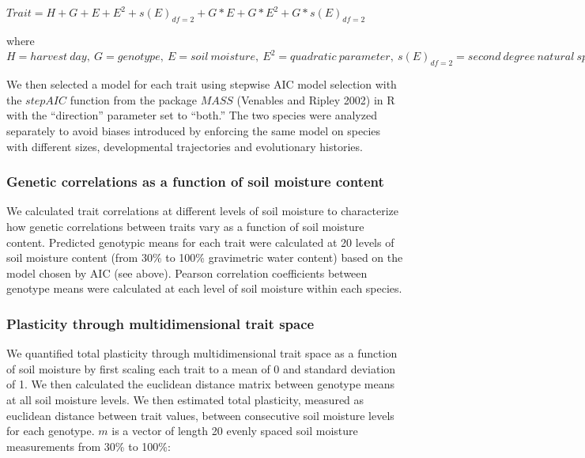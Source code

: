 \documentclass[jou,floatsintext]{apa6}
\begin{document}
\(Trait = H+G+E+E^2+s(E)_{df=2}+G*E+G*E^2+G*s(E)_{df=2}\)

where \(H = harvest\ day, \ G = genotype,\ E = soil\ moisture,\ E^2 = quadratic\ parameter,\ s(E)_{df=2} = second\ degree\ natural\ spline\ parameter\)

We then selected a model for each trait using stepwise AIC model selection with the \(stepAIC\) function from the package \(MASS\) (Venables and Ripley 2002) in R with the \enquote{direction} parameter set to \enquote{both.} The two species were analyzed separately to avoid biases introduced by enforcing the same model on species with different sizes, developmental trajectories and evolutionary histories.

\hypertarget{genetic-correlations-as-a-function-of-soil-moisture-content}{%
\subsubsection{Genetic correlations as a function of soil moisture content}\label{genetic-correlations-as-a-function-of-soil-moisture-content}}

We calculated trait correlations at different levels of soil moisture to characterize how genetic correlations between traits vary as a function of soil moisture content. Predicted genotypic means for each trait were calculated at 20 levels of soil moisture content (from 30\% to 100\% gravimetric water content) based on the model chosen by AIC (see above). Pearson correlation coefficients between genotype means were calculated at each level of soil moisture within each species.

\hypertarget{plasticity-through-multidimensional-trait-space}{%
\subsubsection{Plasticity through multidimensional trait space}\label{plasticity-through-multidimensional-trait-space}}

We quantified total plasticity through multidimensional trait space as a function of soil moisture by first scaling each trait to a mean of 0 and standard deviation of 1. We then calculated the euclidean distance matrix between genotype means at all soil moisture levels. We then estimated total plasticity, measured as euclidean distance between trait values, between consecutive soil moisture levels for each genotype. \(m\) is a vector of length 20 evenly spaced soil moisture measurements from 30\% to 100\%:
\end{document}
